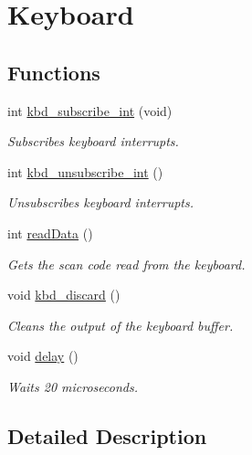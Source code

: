 \hypertarget{group___keyboard}{}\section{Keyboard}
\label{group___keyboard}
\subsection*{Functions}
\begin{DoxyCompactItemize}
\item 
int \hyperlink{group___keyboard_gafba3a35bd6a79305e84ab4f33a5ffa7f}{kbd\+\_\+subscribe\+\_\+int} (void)
\begin{DoxyCompactList}\small\item\em Subscribes keyboard interrupts. \end{DoxyCompactList}\item 
int \hyperlink{group___keyboard_ga5bdf6cfb570c375192b0d87913b65c57}{kbd\+\_\+unsubscribe\+\_\+int} ()
\begin{DoxyCompactList}\small\item\em Unsubscribes keyboard interrupts. \end{DoxyCompactList}\item 
int \hyperlink{group___keyboard_ga7038ddb0c35ef732a786679094a9de0e}{read\+Data} ()
\begin{DoxyCompactList}\small\item\em Gets the scan code read from the keyboard. \end{DoxyCompactList}\item 
void \hyperlink{group___keyboard_gaa446b75f68daaa0d8af27bad682c3c45}{kbd\+\_\+discard} ()
\begin{DoxyCompactList}\small\item\em Cleans the output of the keyboard buffer. \end{DoxyCompactList}\item 
void \hyperlink{group___keyboard_gabb9ee10191569258e0f22bdd0a95ba62}{delay} ()
\begin{DoxyCompactList}\small\item\em Waits 20 microseconds. \end{DoxyCompactList}\end{DoxyCompactItemize}


\subsection{Detailed Description}


